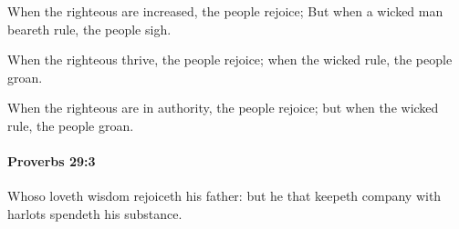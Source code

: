 			\begin{versebox}
					\item[BHS] 
					\item[ASV] When the righteous are increased, the people rejoice; But when a wicked man beareth rule, the people sigh.
					\item[NIV] When the righteous thrive, the people rejoice; when the wicked rule, the people groan.
					\item[NRSV] When the righteous are in authority, the people rejoice; but when the wicked rule, the people groan.
			\end{versebox}

		\paragraph{Proverbs 29:3} %
			\label{PROVERBS-29-3}

			Whoso loveth wisdom rejoiceth his father: but he that keepeth company with harlots spendeth his substance.

